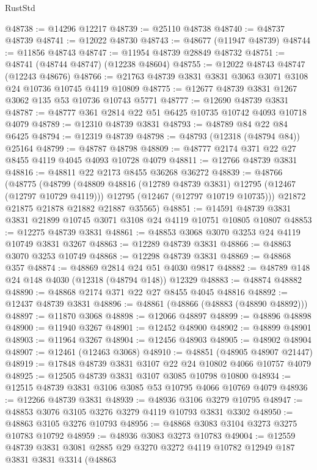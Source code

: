 \begin{lexlean}{RustStd}
\begin{coremodule}
@48738 := @14296 @12217
@48739 := @25110 @48738
@48740 := @48737 @48739
@48741 := @12022 @48730
@48743 := @48677 (@11947 @48739)
@48744 := @11856 @48743
@48747 := @11954 @48739 @28849 @48732
@48751 := @48741 (@48744 @48747) (@12238 @48604)
@48755 := @12022 @48743 @48747 (@12243 @48676)
@48766 := @21763 @48739 @3831 @3831 @3063 @3071 @3108 @24 @10736 @10745 @4119 @10809
@48775 := @12677 @48739 @3831 @1267 @3062 @135 @53 @10736 @10743 @5771
@48777 := @12690 @48739 @3831
@48787 := @48777 @361 @2814 @22 @51 @6425 @10735 @10742 @4093 @10718 @4079
@48789 := @12310 @48739 @3831
@48793 := @48789 @84 @22 @84 @6425
@48794 := @12319 @48739
@48798 := @48793 (@12318 (@48794 @84)) @25164
@48799 := @48787 @48798
@48809 := @48777 @2174 @371 @22 @27 @8455 @4119 @4045 @4093 @10728 @4079
@48811 := @12766 @48739 @3831
@48816 := @48811 @22 @2173 @8455 @36268 @36272
@48839 := @48766
    (@48775
      (@48799
        (@48809 @48816 (@12789 @48739 @3831) @12795 (@12467 (@12797 @10729 @4119)))
        @12795
        (@12467 (@12797 @10719 @10735)))
      @21872
      @21875
      @21878
      @21882
      @21887
      @35565)
@48851 := @14591 @48739 @3831 @3831 @21899 @10745 @3071 @3108 @24 @4119 @10751 @10805 @10807
@48853 := @12275 @48739 @3831
@48861 := @48853 @3068 @3070 @3253 @24 @4119 @10749 @3831 @3267
@48863 := @12289 @48739 @3831
@48866 := @48863 @3070 @3253 @10749
@48868 := @12298 @48739 @3831
@48869 := @48868 @357
@48874 := @48869 @2814 @24 @51 @4030 @9817
@48882 := @48789 @148 @24 @148 @4030 (@12318 (@48794 @148)) @12329
@48883 := @48874 @48882
@48890 := @48868 @2174 @371 @22 @27 @8455 @4045 @48816
@48892 := @12437 @48739 @3831
@48896 := @48861 (@48866 (@48883 (@48890 @48892)))
@48897 := @11870 @3068
@48898 := @12066 @48897
@48899 := @48896 @48898
@48900 := @11940 @3267
@48901 := @12452 @48900
@48902 := @48899 @48901
@48903 := @11964 @3267
@48904 := @12456 @48903
@48905 := @48902 @48904
@48907 := @12461 (@12463 @3068)
@48910 := @48851 (@48905 @48907 @21447)
@48919 := @17848 @48739 @3831 @3107 @22 @24 @10802 @4066 @10757 @4079
@48925 := @12505 @48739 @3831 @3107 @3085 @10798 @10800
@48934 := @12515 @48739 @3831 @3106 @3085 @53 @10795 @4066 @10769 @4079
@48936 := @12266 @48739 @3831
@48939 := @48936 @3106 @3279 @10795
@48947 := @48853 @3076 @3105 @3276 @3279 @4119 @10793 @3831 @3302
@48950 := @48863 @3105 @3276 @10793
@48956 := @48868 @3083 @3104 @3273 @3275 @10783 @10792
@48959 := @48936 @3083 @3273 @10783
@49004 := @12559
    @48739
    @3831
    @3081
    @2885
    @29
    @3270
    @3272
    @4119
    @10782
    @12949
    @187
    @3831
    @3831
    @3314
    (@48863

\end{coremodule}
\end{lexlean}
